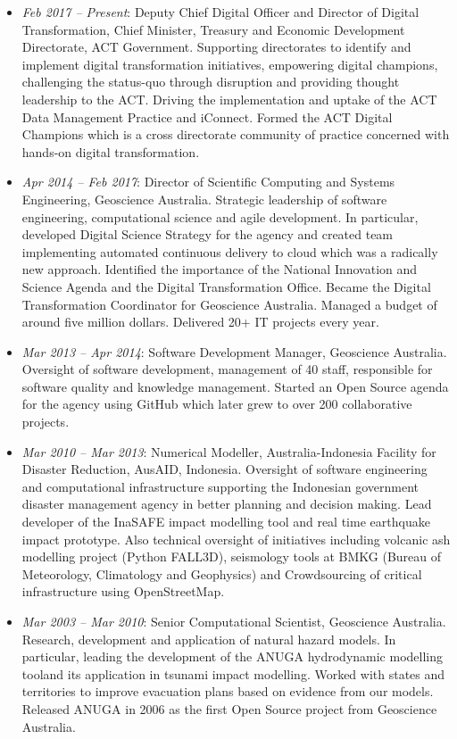 \documentclass[11pt,a4paper]{article}
\begin{document}
\begin{itemize}
\item {\em Feb 2017 -- Present}: Deputy Chief Digital Officer and Director of Digital Transformation, Chief Minister, Treasury and Economic Development Directorate, ACT Government.
      Supporting directorates to identify and implement digital transformation initiatives, empowering digital champions, challenging the status-quo through disruption and providing thought leadership to the ACT. Driving the implementation and uptake of the ACT Data Management Practice and iConnect. Formed the ACT Digital Champions which is a cross directorate community of practice concerned with hands-on digital transformation. 
\item {\em Apr 2014 -- Feb 2017}: Director of Scientific Computing and Systems Engineering, Geoscience Australia.
      Strategic leadership of software engineering, computational science and agile development.
      In particular, developed Digital Science Strategy for the agency and created team implementing automated continuous delivery to cloud which
      was a radically new approach.
      Identified the importance of the National Innovation and Science Agenda and the Digital Transformation Office. Became the Digital Transformation Coordinator for Geoscience Australia. Managed a budget of around five million dollars.
      Delivered 20+ IT projects every year.
\item {\em Mar 2013 -- Apr 2014}: Software Development Manager, Geoscience Australia.
      Oversight of software development, management of 40 staff, responsible for software quality and knowledge management. Started an Open Source agenda for the agency using GitHub which later grew to over 200 collaborative projects.
\item {\em Mar 2010 -- Mar 2013}: Numerical Modeller, Australia-Indonesia Facility for Disaster Reduction, AusAID, Indonesia.
      Oversight of software engineering and computational infrastructure supporting the Indonesian government disaster management agency in better planning and decision making. Lead developer of the InaSAFE impact modelling tool and real time earthquake impact prototype. Also technical oversight of initiatives including volcanic ash modelling project (Python FALL3D), seismology tools at BMKG (Bureau of Meteorology, Climatology and Geophysics) and Crowdsourcing of critical infrastructure using OpenStreetMap.
\item {\em Mar 2003 -- Mar 2010}: Senior Computational Scientist, Geoscience Australia.
      Research, development and application of natural hazard models. In particular, leading the development of the ANUGA hydrodynamic modelling tooland its application in tsunami impact modelling. Worked with states and territories to improve evacuation plans based on evidence from our models. Released ANUGA in 2006 as the first Open Source project from Geoscience Australia.

\end{itemize}
\end{document}
